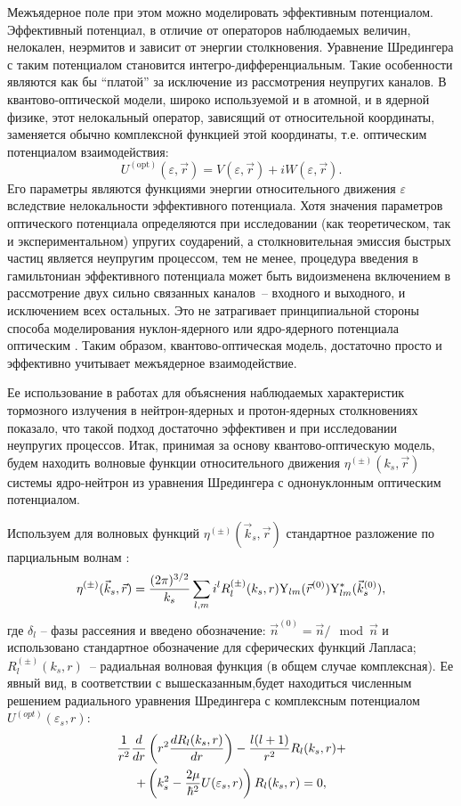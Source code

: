 Межъядерное поле при этом можно моделировать эффективным потенциалом.
Эффективный потенциал, в отличие
от операторов наблюдаемых величин,
нелокален,
неэрмитов и  зависит от энергии столкновения. Уравнение Шредингера с таким
потенциалом становится интегро-дифференциальным. Такие особенности являются
как бы ``платой'' за исключение из рассмотрения неупругих каналов.
В квантово-оптической модели, широко используемой и в атомной, и в ядерной физике,
этот нелокальный оператор, зависящий от относительной координаты, заменяется
обычно комплексной функцией этой координаты, т.е. оптическим
потенциалом взаимодействия:
\begin{equation}\label{OptPot}
U^{(\mathrm{opt})}(\varepsilon,\vec r)=V(\varepsilon,\vec r)+iW(\varepsilon,\vec r).
\end{equation}
Его параметры  являются функциями энергии относительного движения $\varepsilon$ вследствие нелокальности эффективного
потенциала. Хотя значения параметров оптического потенциала определяются при исследовании (как теоретическом, так и
экспериментальном) упругих соударений, а столкновительная эмиссия быстрых частиц является неупругим процессом, тем не
менее, процедура введения в гамильтониан эффективного потенциала может быть видоизменена включением в рассмотрение двух
сильно связанных каналов~-- входного и выходного, и исключением всех остальных. Это не затрагивает принципиальной стороны
способа моделирования нуклон-ядерного или ядро-ядерного потенциала оптическим \cite{Bal}. Таким образом,
квантово-оптическая модель,  достаточно просто и эффективно учитывает межъядерное взаимодействие.

Ее использование в работах \cite{kor7,kor8,kor9,kor10} для объяснения
наблюдаемых характеристик тормозного излучения в нейтрон-ядерных и протон-ядерных
столкновениях показало, что такой подход достаточно эффективен и при исследовании
неупругих процессов.
Итак, принимая за основу квантово-оптическую модель, будем находить
волновые функции относительного движения $\eta^{(\pm)}(k_s, \vec r)$
системы ядро-нейтрон из уравнения Шредингера с однонуклонным
оптическим потенциалом.

Используем для волновых функций $\eta^{(\pm)} (\vec k_s, \vec r)$ стандартное разложение по парциальным волнам
\cite{sobelman}:
\begin{eqnarray}\label{eta}
\eta^{(\pm)} (\vec k_s, \vec r)={(2\pi)^{3/2} \over k_s} \sum_{l,m} i^l
R_l^{(\pm)}(k_s,r){\rm Y}_{lm}(\vec r^{(0)}) {\rm Y}_{lm}^*(\vec k_s^{(0)}),
\end{eqnarray}
где $\delta_l$ -- фазы рассеяния и введено обозначение:
$\vec n^{(0)}=\vec n / \mod{\vec n}$
и использовано стандартное
обозначение для сферических функций Лапласа;
$R_l^{(\pm)}(k_s,r)$~-- радиальная волновая
функция (в общем случае комплексная). Ее явный вид, в соответствии с вышесказанным,будет  находиться численным
решением радиального уравнения Шредингера с комплексным потенциалом $U^{(opt)}(\varepsilon_s,r)$:
\begin{multline}\label{eqsh}
{1\over{r^2}}{d\over{dr}}\left(r^2{{dR_l(k_s,r)}\over{dr}}\right)-{{l(l+1)}
\over{r^2}}R_l(k_s,r)+\\
+\left(k^2_s-{{2\mu}\over{\hbar^2}}U(\varepsilon_s,r)\right)R_l(k_s,r)=0,
\end{multline}

